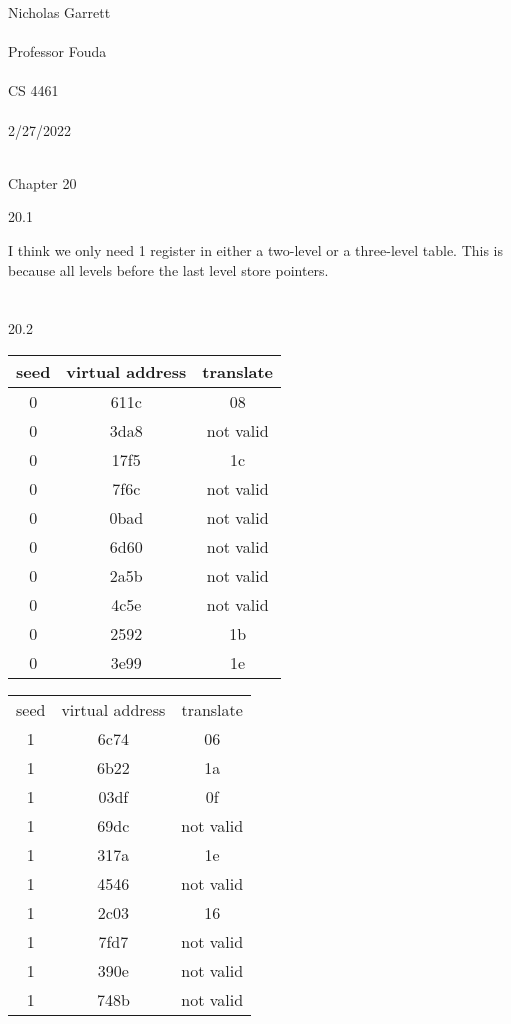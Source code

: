 \documentclass[12pt, a4paper]{article}
\begin{document}
\noindent
Nicholas Garrett\\ \\
Professor Fouda\\ \\
CS 4461\\ \\
2/27/2022\\ \\


\begin{center}
\end{center}

\noindent
Chapter 20

	20.1
	
		I think we only need 1 register in either a two-level or a three-level table. This is because all levels before the last level store pointers. \\ \\ \\
			
	20.2
	
		\begin{center}
		\begin{tabular}{||c c c||} 
 		\hline
		 seed & virtual address & translate \\ [0.5ex] 
		 \hline\hline
		 0 & 611c & 08 \\
		 0 & 3da8 &not valid \\ 		 
		 0 & 17f5 & 1c\\ 
		 0 & 7f6c & not valid\\ 
		 0 & 0bad & not valid\\ 
		 0 & 6d60 & not valid\\ 		 
		 0 & 2a5b & not valid\\ 
		 0 & 4c5e & not valid\\ 
		 0 & 2592 & 1b\\ 		 
		 0 & 3e99 & 1e\\ 
		 \hline
		 \end{tabular}
		\end{center}
		 
		 \begin{center}
		\begin{tabular}{||c c c||} 
 		\hline
		 seed & virtual address & translate \\ [0.5ex]
		 1 & 6c74 &06 \\
		 1 & 6b22 & 1a \\
		 1 & 03df& 0f \\
		 1 & 69dc & not valid \\
		 1 & 317a& 1e \\
		 1 & 4546 &not valid \\
		 1 & 2c03 &16 \\
		 1 & 7fd7 &not valid \\
		 1 & 390e &not valid \\
		 1 & 748b & not valid \\
		 \hline
		 \end{tabular}
		\end{center}
		 
\end{document}
